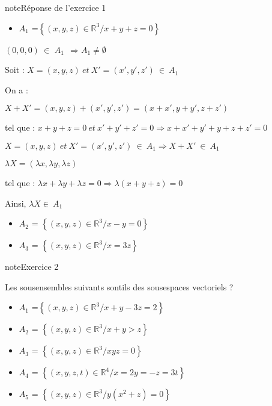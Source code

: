 \documentclass[letterpaper,10pt,french]{jupyterBook}
\begin{document}
\begin{sphinxadmonition}{note}{Réponse de l’exercice 1}
\begin{itemize}
\item {} 
\sphinxAtStartPar
\(A_1\) =\( \left\{ (x,y,z) \in \mathbb{R}^3 / x+y+z = 0 \right\}\)

\end{itemize}

\sphinxAtStartPar
\((0,0,0) ~\in\) \(A_1 ~~ \Rightarrow A_1 \neq  \emptyset\)

\sphinxAtStartPar
Soit :  \(X=(x,y,z) ~ et~ X'= (x',y',z') ~ \in ~A_1\)

\sphinxAtStartPar
On a :

\sphinxAtStartPar
\(X+ X' = (x,y,z) + (x',y',z') = (x+x',y+y',z+z')\)

\sphinxAtStartPar
tel que : \(x+y+z = 0 ~et~ x'+y'+z' = 0 \Rightarrow x+x'+y'+ y+ z +z' = 0 \)

\sphinxAtStartPar
\(X=(x,y,z) ~ et~ X'= (x',y',z') ~ \in ~A_1 \Rightarrow X+ X'~ \in ~A_1\)

\sphinxAtStartPar
\(\lambda X = (\lambda x, \lambda y,\lambda z)\)

\sphinxAtStartPar
tel que :
\(\lambda x+ \lambda y+ \lambda z = 0 \Rightarrow \lambda (x+y+z) = 0\)

\sphinxAtStartPar
Ainsi, \(\lambda X \in ~A_1\)
\begin{itemize}
\item {} 
\sphinxAtStartPar
\(A_2\) = \( \left\{ (x,y,z) \in \mathbb{R}^3 / x-y = 0 \right\}\)

\item {} 
\sphinxAtStartPar
\(A_3\) = \( \left\{ (x,y,z) \in \mathbb{R}^3 / x =3z \right\}\)

\end{itemize}
\end{sphinxadmonition}

\begin{sphinxadmonition}{note}{Exercice 2}

\sphinxAtStartPar
Les sous\sphinxhyphen{}ensembles suivants sont\sphinxhyphen{}ils des sous\sphinxhyphen{}espaces vectoriels ?
\begin{itemize}
\item {} 
\sphinxAtStartPar
\(A_1\) =\( \left\{ (x,y,z) \in \mathbb{R}^3 / x+y-3z = 2 \right\}\)

\item {} 
\sphinxAtStartPar
\(A_2\) =  \(\left\{ (x,y,z) \in \mathbb{R}^3 / x+y > z \right\}\)

\item {} 
\sphinxAtStartPar
\(A_3\) = \( \left\{ (x,y,z) \in \mathbb{R}^3 / xyz = 0 \right\}\)

\item {} 
\sphinxAtStartPar
\(A_4\) = \( \left\{ (x,y,z, t) \in \mathbb{R}^4 / x = 2y= -z=3t \right\}\)

\item {} 
\sphinxAtStartPar
\(A_5\) = \( \left\{ (x,y,z) \in \mathbb{R}^3 / y(x^2+z) = 0 \right\}\)

\end{itemize}
\end{sphinxadmonition}
\end{document}
